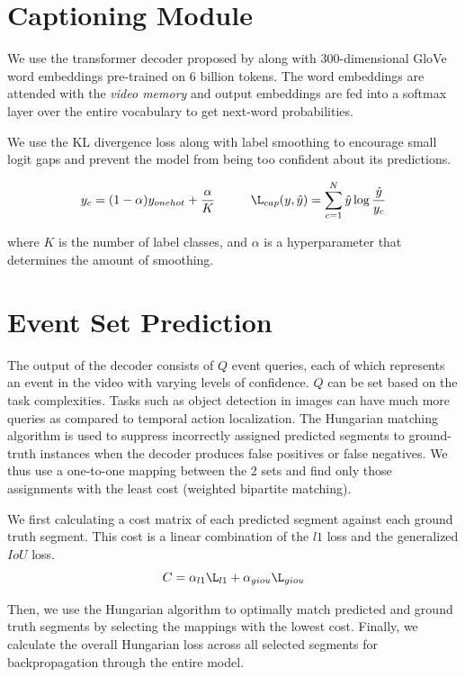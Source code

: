 \section{Captioning Module}
\par We use the transformer decoder proposed by \cite{tfm} along with 300-dimensional GloVe word embeddings pre-trained on 6 billion tokens\cite{glove}. The word embeddings are attended with the \textit{video memory} and output embeddings are fed into a softmax layer over the entire vocabulary to get next-word probabilities.
\par We use the KL divergence loss along with label smoothing to encourage small logit gaps and prevent the model from being too confident about its predictions.

$$y _{c}= (1 - \alpha)y_{onehot} + \frac{\alpha}{K} \hspace{1cm} \L_{cap}(y, \hat{y}) = \sum_{c=1}^{N}\hat{y} \log{\frac{\hat{y}}{y_c}}$$

\par where $K$ is the number of label classes, and $\alpha$ is a hyperparameter that determines the amount of smoothing.

\section{Event Set Prediction}
\par The output of the decoder consists of $Q$ event queries, each of which represents an event in the video with varying levels of confidence. $Q$ can be set based on the task complexities. Tasks such as object detection in images can have much more queries as compared to temporal action localization. The Hungarian matching algorithm is used to suppress incorrectly assigned predicted segments to ground-truth instances when the decoder produces false positives or false negatives. We thus use a one-to-one mapping between the 2 sets and find only those assignments with the least cost (weighted bipartite matching).
\par We first calculating a cost matrix of each predicted segment against each ground truth segment. This cost is a linear combination of the $l1$ loss and the generalized $IoU$ loss.
$$ C = \alpha_{l1}\L_{l1}  + \alpha_{giou}\L_{giou}$$
\par Then, we use the Hungarian algorithm \cite{hungarian} to optimally match predicted and ground truth segments by selecting the mappings with the lowest cost. Finally, we calculate the overall Hungarian loss across all selected segments for backpropagation through the entire model.

